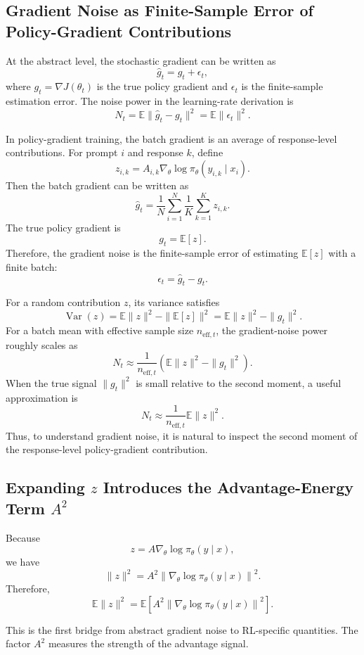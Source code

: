 \documentclass[11pt,a4paper]{article}
\begin{document}
\subsection{Gradient Noise as Finite-Sample Error of Policy-Gradient Contributions}

At the abstract level, the stochastic gradient can be written as
\[
\hat g_t=g_t+\epsilon_t,
\]
where \(g_t=\nabla J(\theta_t)\) is the true policy gradient and \(\epsilon_t\) is the finite-sample estimation error. The noise power in the learning-rate derivation is
\[
N_t
=
\mathbb{E}\|\hat g_t-g_t\|^2
=
\mathbb{E}\|\epsilon_t\|^2.
\]

In policy-gradient training, the batch gradient is an average of response-level contributions. For prompt \(i\) and response \(k\), define
\[
z_{i,k}
=
A_{i,k}\nabla_\theta \log \pi_\theta(y_{i,k}\mid x_i).
\]
Then the batch gradient can be written as
\[
\hat g_t
=
\frac{1}{N}
\sum_{i=1}^{N}
\frac{1}{K}
\sum_{k=1}^{K}
z_{i,k}.
\]
The true policy gradient is
\[
g_t=\mathbb{E}[z].
\]
Therefore, the gradient noise is the finite-sample error of estimating \(\mathbb{E}[z]\) with a finite batch:
\[
\epsilon_t=\hat g_t-g_t.
\]

For a random contribution \(z\), its variance satisfies
\[
\operatorname{Var}(z)
=
\mathbb{E}\|z\|^2
-
\|\mathbb{E}[z]\|^2
=
\mathbb{E}\|z\|^2
-
\|g_t\|^2.
\]
For a batch mean with effective sample size \(n_{\mathrm{eff},t}\), the gradient-noise power roughly scales as
\[
N_t
\approx
\frac{1}{n_{\mathrm{eff},t}}
\left(
\mathbb{E}\|z\|^2-\|g_t\|^2
\right).
\]
When the true signal \(\|g_t\|^2\) is small relative to the second moment, a useful approximation is
\[
N_t
\approx
\frac{1}{n_{\mathrm{eff},t}}
\mathbb{E}\|z\|^2.
\]
Thus, to understand gradient noise, it is natural to inspect the second moment of the response-level policy-gradient contribution.

\subsection{Expanding \(z\) Introduces the Advantage-Energy Term \(A^2\)}

Because
\[
z=A\nabla_\theta\log\pi_\theta(y\mid x),
\]
we have
\[
\|z\|^2
=
A^2
\left\|
\nabla_\theta\log\pi_\theta(y\mid x)
\right\|^2.
\]
Therefore,
\[
\mathbb{E}\|z\|^2
=
\mathbb{E}
\left[
A^2
\left\|
\nabla_\theta\log\pi_\theta(y\mid x)
\right\|^2
\right].
\]

This is the first bridge from abstract gradient noise to RL-specific quantities. The factor \(A^2\) measures the strength of the advantage signal.
\end{document}

